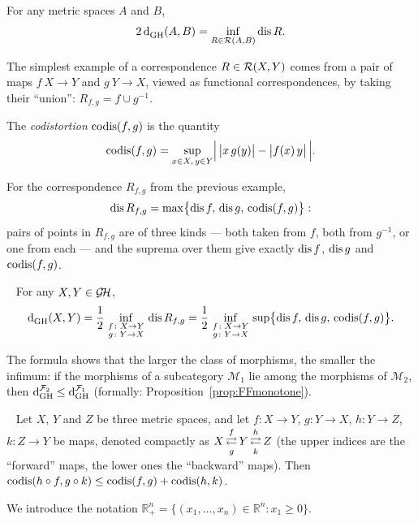   
\begin{proposition}\label{theorem:main_formula}
  For any metric spaces $A$ and $B$,
  \begin{equation*}
      2\operatorname{d}^{}_{\mathrm{GH}}(A,B) = \underset{R \in \mathcal{R}(A,B)}{\inf} \operatorname{dis} R.
  \end{equation*}
\end{proposition}


\begin{example}
  The simplest example of a correspondence $R \in \mathcal{R}(X,Y)$ comes from a pair of maps $f \: X \to Y$ and $g \: Y \to X$, viewed as functional correspondences, by taking their ``union'': $R_{f,g} = f \cup g^{-1}$.
\end{example}
\begin{define}
  The \emph{codistortion} $\operatorname{codis}(f,g)$ is the quantity
  $$
  \operatorname{codis}(f,g)=\sup_{x\in X,\,y\in Y}\Bigl|\,\bigl|x\,g(y)\bigr|-\bigl|f(x)\,y\bigr|\,\Bigr|.
  $$
\end{define}
For the correspondence $R_{f,g}$ from the previous example,
$$
\operatorname{dis} R_{f,g} = \max\bigl\{\operatorname{dis} f,\,\operatorname{dis} g,\,\operatorname{codis}(f,g)\bigr\}:
$$
pairs of points in $R_{f,g}$ are of three kinds --- both taken from $f$, both from $g^{-1}$, or one from each --- and the suprema over them give exactly $\operatorname{dis} f$, $\operatorname{dis} g$ and $\operatorname{codis}(f,g)$.

\begin{proposition}~\label{prop: gh via maps}
  For any $X,Y\in\operatorname{\mathcal{G\!H}}$,
  $$
  \operatorname{d}^{}_{\mathrm{GH}}(X,Y) =  
   \frac12\,\inf_{\substack{f\colon X\to Y\\ g\colon Y\to X}}\, \operatorname{dis} R_{f,g} = 
  \frac12\,\inf_{\substack{f\colon X\to Y\\ g\colon Y\to X}}\,\sup\bigl\{\operatorname{dis} f,\,\operatorname{dis} g,\,\operatorname{codis}(f,g)\bigr\}.
  $$
\end{proposition}

The formula shows that the larger the class of morphisms, the smaller the infimum: if the morphisms of a subcategory $\mathcal{M}_1$ lie among the morphisms of $\mathcal{M}_2$, then $\operatorname{d}^{\mathcal{F}_2}_{\mathrm{GH}}\le\operatorname{d}^{\mathcal{F}_1}_{\mathrm{GH}}$ (formally: Proposition~\ref{prop:FFmonotone}).

\begin{proposition}~\label{prop: triangle inequality}
Let $X$, $Y$ and $Z$ be three metric spaces, and let $f: X \to Y$, $g: Y \to X$, $h: Y \to Z$, $k: Z \to Y$ be maps, denoted compactly as $X\torllim^f_gY\torllim^h_kZ$ (the upper indices are the ``forward'' maps, the lower ones the ``backward'' maps). Then $\operatorname{codis}(h\circ f,g\circ k)\le\operatorname{codis}(f,g)+\operatorname{codis}(h,k)$.
\end{proposition}
We introduce the notation $\mathbb{R}_+^n = \{(x_1, \ldots, x_n) \in \mathbb{R}^n : x_1 \geq 0\}$.

